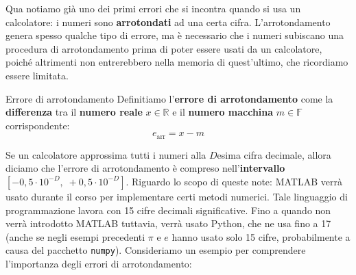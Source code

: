 Qua notiamo già uno dei primi errori che si incontra quando si usa un calcolatore: i numeri sono \textbf{arrotondati} ad una certa cifra. L'arrotondamento genera spesso qualche tipo di errore, ma è necessario che i numeri subiscano una procedura di arrotondamento prima di poter essere usati da un calcolatore, poiché altrimenti non entrerebbero nella memoria di quest'ultimo, che ricordiamo essere limitata.

\begin{definition}{Errore di arrotondamento}
    Definitiamo l'\textbf{errore di arrotondamento} come la \textbf{differenza} tra il \textbf{numero reale} $x \in \mathbb{R}$ e il \textbf{numero macchina} $m \in \mathbb{F}$ corrispondente:
    \[ e_\text{arr} = x - m \]
\end{definition}

Se un calcolatore approssima tutti i numeri alla $D$esima cifra decimale, allora diciamo che l'errore di arrotondamento è compreso nell'\textbf{intervallo} $[-0,5 \cdot 10^{-D}, \; +0,5 \cdot 10^{-D}]$.
\nl
Riguardo lo scopo di queste note: MATLAB verrà usato durante il corso per implementare certi metodi numerici. Tale linguaggio di programmazione lavora con 15 cifre decimali significative. Fino a quando non verrà introdotto MATLAB tuttavia, verrà usato Python, che ne usa fino a 17 (anche se negli esempi precedenti $\pi$ e $e$ hanno usato solo 15 cifre, probabilmente a causa del pacchetto \verb|numpy|).
\nl
Consideriamo un esempio per comprendere l'importanza degli errori di arrotondamento:
